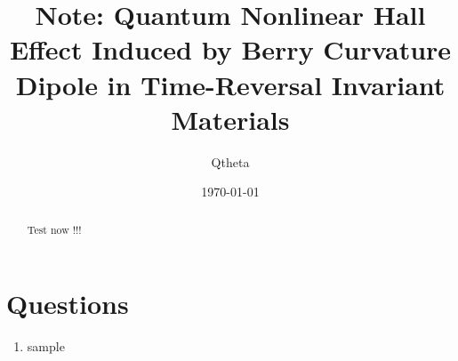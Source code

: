 \documentclass[]{article}
\begin{document}

\title{Note: Quantum Nonlinear Hall Effect Induced by Berry Curvature Dipole in Time-Reversal Invariant Materials}
\author{Qtheta}
\date{\today}

\maketitle

\tableofcontents
\newpage

\begin{abstract}
Test now !!!

\end{abstract}
\section{Questions}
\begin{enumerate}
    \item sample

\end{enumerate}

\end{document}

